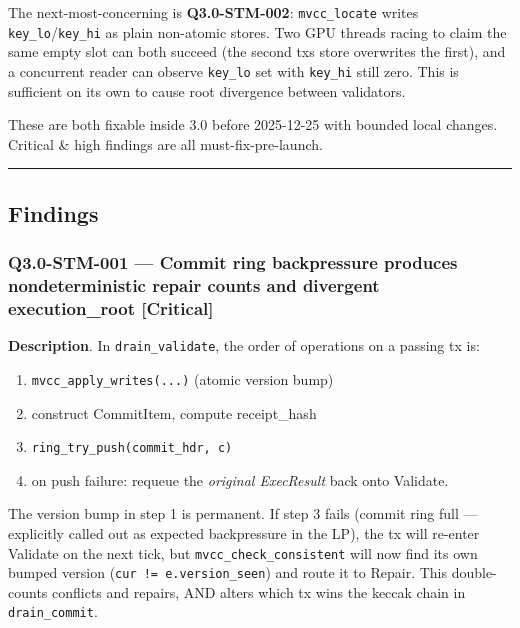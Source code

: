 \documentclass[
]{article}
\providecommand{\tightlist}{%
  \setlength{\itemsep}{0pt}\setlength{\parskip}{0pt}}
\begin{document}
The next-most-concerning is \textbf{Q3.0-STM-002}: \texttt{mvcc\_locate}
writes \texttt{key\_lo}/\texttt{key\_hi} as plain non-atomic stores. Two
GPU threads racing to claim the same empty slot can both succeed (the
second tx\textquotesingle s store overwrites the first), and a
concurrent reader can observe \texttt{key\_lo} set with \texttt{key\_hi}
still zero. This is sufficient on its own to cause root divergence
between validators.

These are both fixable inside 3.0 before 2025-12-25 with bounded local
changes. Critical \& high findings are all must-fix-pre-launch.

\begin{center}\rule{0.5\linewidth}{0.5pt}\end{center}

\subsection{Findings}\label{findings}

\subsubsection{Q3.0-STM-001 --- Commit ring backpressure produces
nondeterministic repair counts and divergent execution\_root
{[}Critical{]}}\label{q30-stm-001--commit-ring-backpressure-produces-nondeterministic-repair-counts-and-divergent-execution_root-critical}

\textbf{Description}. In \texttt{drain\_validate}, the order of
operations on a passing tx is:

\begin{enumerate}
\def\labelenumi{\arabic{enumi}.}
\tightlist
\item
  \texttt{mvcc\_apply\_writes(...)} (atomic version bump)
\item
  construct CommitItem, compute receipt\_hash
\item
  \texttt{ring\_try\_push(commit\_hdr,\ c)}
\item
  on push failure: requeue the \emph{original ExecResult} back onto
  Validate.
\end{enumerate}

The version bump in step 1 is permanent. If step 3 fails (commit ring
full --- explicitly called out as expected backpressure in the LP), the
tx will re-enter Validate on the next tick, but
\texttt{mvcc\_check\_consistent} will now find its own bumped version
(\texttt{cur\ !=\ e.version\_seen}) and route it to Repair. This
double-counts conflicts and repairs, AND alters which tx wins the keccak
chain in \texttt{drain\_commit}.
\end{document}

